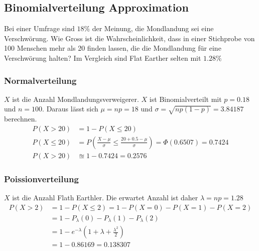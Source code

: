 \subsection{Binomialverteilung Approximation}
Bei einer Umfrage sind $18\%$ der Meinung, die Mondlandung sei eine Verschwörung. Wie Gross ist die Wahrscheinlichkeit, dass in einer Stichprobe von 100 Menschen mehr als 20 finden lassen, die die Mondlandung für eine Verschwörung halten? Im Vergleich sind Flat Earther selten mit $1.28\%$
\subsubsection{Normalverteilung}\label{approx_normal}
$X$ ist die Anzahl Mondlandungsverweigerer. $X$ ist Binomialverteilt mit $p=0.18$ und $n=100$. Daraus lässt sich $\mu=np = 18$ und $\sigma = \sqrt{np(1-p)} = 3.84187$ berechnen.
\begin{align*}
	P(X \gt 20) &= 1 - P(X \le 20) \\
	P(X \le 20) &= P\left(\frac{X - \mu}{\sigma} \le \frac{20 + 0.5 - \mu}{\sigma}\right) = \Phi(0.6507) = 0.7424\\
	P(X \gt 20) &\approxeq 1 - 0.7424 = 0.2576
\end{align*}

\subsubsection{Poissionverteilung}\label{approx_poission}
$X$ ist die Anzahl Flath Earthler. Die erwartet Anzahl ist daher $\lambda = np = 1.28$
\begin{align*}
	P(X \gt 2) &= 1 - P(X \le 2) = 1 - P(X =0) - P(X=1) - P(X=2) \\
	&= 1-P_\lambda(0) -P_\lambda(1)-P_\lambda(2)\\
	&= 1 - e^{-\lambda}\left(1 + \lambda + \frac{\lambda^2}{2}\right)\\
	&= 1 - 0.86169 = 0.138307
\end{align*}

